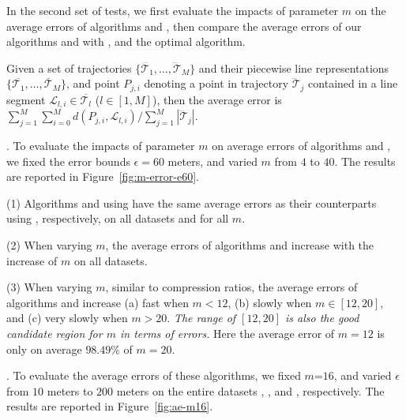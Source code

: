 {In the second set of tests, we first evaluate the impacts of parameter $m$ on the average errors of algorithms \cist and \cista, then compare the average errors of our algorithms \cist and \cista with \dps, \squishe and the optimal algorithm.

Given a set of trajectories $\{\dddot{\mathcal{T}_1}, \ldots, \dddot{\mathcal{T}}_M\}$ and their piecewise line representations $\{\overline{\mathcal{T}_1}, \ldots, \overline{\mathcal{T}}_M\}$, and point $P_{j,i}$ denoting
a point in trajectory $\dddot{\mathcal{T}}_j$ contained in a line segment $\mathcal{L}_{l,i}\in\overline{\mathcal{T}_l}$ ($l\in[1,M]$),
then the average error is $\sum_{j=1}^{M}\sum_{i=0}^{M} d(P_{j,i},
\mathcal{L}_{l,i})/\sum_{j=1}^{M}{|\dddot{\mathcal{T}}_j |}$.




.
To evaluate the impacts of parameter $m$ on average errors of algorithms \cist and \cista, we fixed the error bounds {$\epsilon =60$ meters}, and varied $m$ from $4$ to $40$. The results are reported in Figure~\ref{fig:m-error-e60}.



\ni(1) Algorithms \cist and \cista using \rpia have the same average errors as their counterparts using \cpia, respectively, on all datasets and for all $m$.

\ni(2) When varying $m$, the average errors of algorithms \cist and \cista increase with the increase of $m$ on all datasets.

\ni(3) When varying $m$, similar to compression ratios, the average errors of
algorithms \cist and \cista increase (a) fast when $m < 12$, (b) slowly when $m
\in [12, 20]$, and (c) very slowly when $m > 20$.
\emph{The range of $[12, 20]$ is also the good candidate region for $m$ in terms of errors.}
Here the average error of $m=12$ is only on average {$98.49\%$} of $m=20$.




.
To evaluate the average errors of these algorithms, we fixed {$m$=$16$}, and
varied $\epsilon$ from $10$ meters to $200$ meters on the entire
{datasets} \sercar, \geolife, \mopsi and \pricar, respectively.
The results are reported in Figure~\ref{fig:ae-m16}.

}
